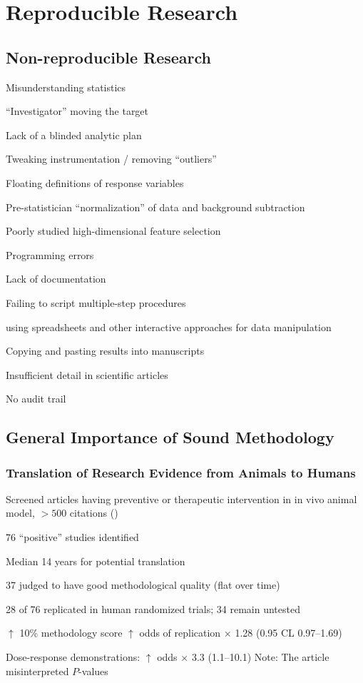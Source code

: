 \chapter{Reproducible Research}
\section{Non-reproducible Research}
\bi
\item Misunderstanding statistics
\item ``Investigator'' moving the target
\item Lack of a blinded analytic plan
\item Tweaking instrumentation / removing ``outliers''
\item Floating definitions of response variables
\item Pre-statistician ``normalization'' of data and background subtraction 
\item Poorly studied high-dimensional feature selection
\item Programming errors
\item Lack of documentation
\item Failing to script multiple-step procedures
 \bi
 \item using spreadsheets and other interactive approaches for data
 manipulation
 \ei
\item Copying and pasting results into manuscripts
\item Insufficient detail in scientific articles
\item No audit trail
\ei

\section{General Importance of Sound Methodology}
\subsection{Translation of Research Evidence from Animals to Humans}
\bi
\item Screened articles having preventive or therapeutic intervention
  in in vivo animal model, $> 500$ citations (\citet{hac06tra}) 
\item 76 ``positive'' studies identified
\item Median 14 years for potential translation
\item 37 judged to have good methodological quality (flat over time)
\item 28 of 76 replicated in human randomized trials; 34 remain untested
\item $\uparrow$ 10\% methodology score $\uparrow$ odds of
replication $\times$ 1.28 (0.95 CL 0.97--1.69)
\item Dose-response demonstrations: $\uparrow$ odds $\times$ 3.3 (1.1--10.1)
\ei
Note: The article misinterpreted $P$-values

